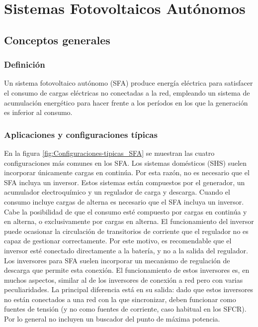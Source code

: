
\chapter{Sistemas Fotovoltaicos Autónomos\label{cha:Sistemas-Fotovoltaicos-Autonomos}}




\section{Conceptos generales}


\subsection{Definición}

Un sistema fotovoltaico autónomo (SFA) produce energía eléctrica para
satisfacer el consumo de cargas eléctricas no conectadas a la red,
empleando un sistema de acumulación energético para hacer frente a
los períodos en los que la generación es inferior al consumo.  


\subsection{Aplicaciones y configuraciones típicas}

En la figura \ref{fig:Configuraciones-tipicas_SFA} se muestran
las cuatro configuraciones más comunes en los SFA. Los sistemas domésticos
(SHS) suelen incorporar únicamente cargas en continúa. Por esta razón,
no es necesario que el SFA incluya un inversor. Estos sistemas están
compuestos por el generador, un acumulador electroquímico y un regulador
de carga y descarga. Cuando el consumo incluye cargas de alterna es
necesario que el SFA incluya un inversor. Cabe la posibilidad de que
el consumo esté compuesto por cargas en continúa y en alterna, o exclusivamente
por cargas en alterna. El funcionamiento del inversor puede ocasionar
la circulación de transitorios de corriente que el regulador no es
capaz de gestionar correctamente. Por este motivo, es recomendable
que el inversor esté conectado directamente a la batería, y no a la
salida del regulador. Los inversores para SFA suelen incorporar un
mecanismo de regulación de descarga que permite esta conexión. El
funcionamiento de estos inversores es, en muchos aspectos, similar
al de los inversores de conexión a red pero con varias peculiaridades.
La principal diferencia está en su salida: dado que estos inversores
no están conectados a una red con la que sincronizar, deben funcionar
como fuentes de tensión (y no como fuentes de corriente, caso habitual
en los SFCR). Por lo general no incluyen un buscador del punto de
máxima potencia.

